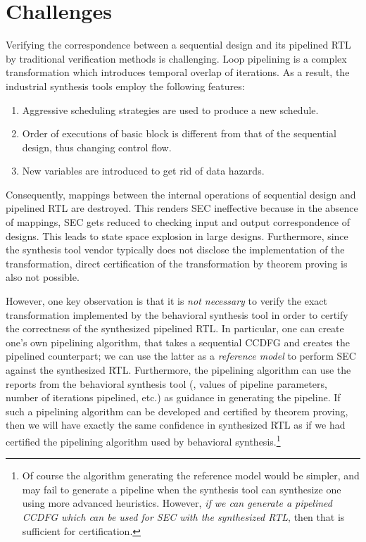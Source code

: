 \section{Challenges}
\label{sec:not-verifiable}

Verifying the correspondence between a sequential design and
its pipelined RTL by traditional verification methods is
challenging.  Loop pipelining is a complex transformation
which introduces temporal overlap of iterations. As a
result, the industrial synthesis tools employ the following
features:

\begin{enumerate}
\item Aggressive scheduling strategies are used to produce a
  new schedule.
\item Order of executions of basic block is different from
that of the sequential design, thus changing control flow.
\item New variables are introduced to get rid of data hazards.
\end{enumerate}

Consequently, mappings between the internal operations of
sequential design and pipelined RTL are destroyed. This renders SEC ineffective because in the absence of mappings, SEC gets reduced to checking
input and output correspondence of designs.
This leads to
state space explosion in large designs. Furthermore, since
the synthesis tool vendor typically does not disclose
the implementation of the transformation, direct
certification of the transformation by theorem proving is
also not possible.

However, one key observation is that it is {\em not necessary} to verify the exact transformation implemented
by the behavioral synthesis tool in order to certify the
correctness of the synthesized pipelined RTL. In
particular, one can create one's own pipelining algorithm, that takes a sequential CCDFG and creates the
pipelined counterpart; we can use the latter as a {\em reference
  model} to perform SEC against the synthesized RTL.
Furthermore, the pipelining algorithm can use the
reports from the behavioral synthesis tool (\eg, values of
pipeline parameters, number of iterations pipelined, etc.)
as guidance in generating the pipeline. If such a
pipelining algorithm can be developed and certified
by theorem proving, then we will have exactly the same
confidence in synthesized RTL as if we had certified the
pipelining algorithm used by behavioral
synthesis.\footnote{Of course the algorithm generating the
  reference model would be simpler, and may fail to generate a pipeline when the synthesis tool can synthesize one using more advanced heuristics.  However, {\em if we can generate a pipelined CCDFG which can be used for SEC with the synthesized RTL}, then that is sufficient for
  certification.}

